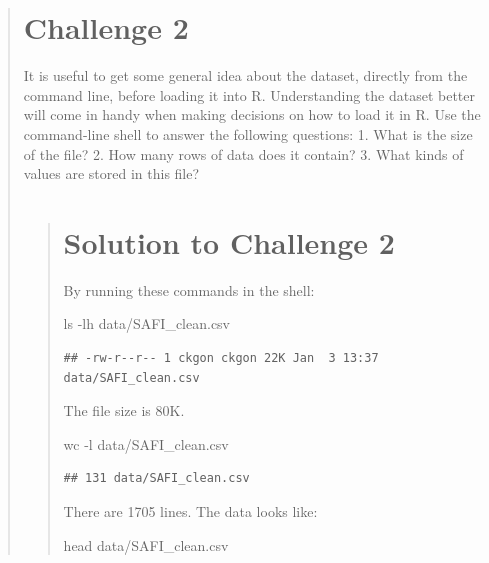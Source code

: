 \documentclass[]{book}
\newenvironment{Shaded}{\begin{snugshade}}{\end{snugshade}}
\newcommand{\FunctionTok}[1]{\textcolor[rgb]{0.00,0.00,0.00}{#1}}
\newcommand{\NormalTok}[1]{#1}
\begin{document}
\begin{quote}
\section{Challenge 2}\label{challenge-2}

It is useful to get some general idea about the dataset, directly from
the command line, before loading it into R. Understanding the dataset
better will come in handy when making decisions on how to load it in R.
Use the command-line shell to answer the following questions: 1. What is
the size of the file? 2. How many rows of data does it contain? 3. What
kinds of values are stored in this file?

\begin{quote}
\section{Solution to Challenge 2}\label{solution-to-challenge-2}

By running these commands in the shell:

\begin{Shaded}
\begin{Highlighting}[]
\FunctionTok{ls}\NormalTok{ -lh data/SAFI_clean.csv}
\end{Highlighting}
\end{Shaded}

\begin{verbatim}
## -rw-r--r-- 1 ckgon ckgon 22K Jan  3 13:37 data/SAFI_clean.csv
\end{verbatim}

The file size is 80K.

\begin{Shaded}
\begin{Highlighting}[]
\FunctionTok{wc}\NormalTok{ -l data/SAFI_clean.csv}
\end{Highlighting}
\end{Shaded}

\begin{verbatim}
## 131 data/SAFI_clean.csv
\end{verbatim}

There are 1705 lines. The data looks like:

\begin{Shaded}
\begin{Highlighting}[]
\FunctionTok{head}\NormalTok{ data/SAFI_clean.csv}
\end{Highlighting}
\end{Shaded}


\end{quote}
\end{quote}
\end{document}
